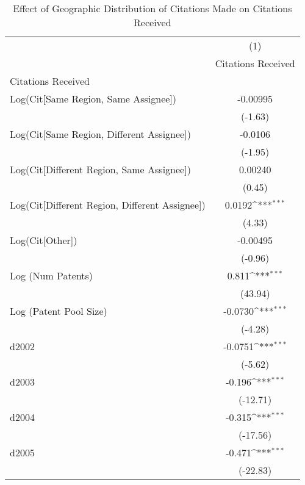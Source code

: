 {
\def\sym#1{\ifmmode^{#1}\else\(^{#1}\)\fi}
\begin{longtable}{l*{1}{c}}
\caption{Effect of Geographic Distribution of Citations Made on Citations Received \label{xtnbreg01}}\\
\hline\hline\endfirsthead\hline\endhead\hline\endfoot\endlastfoot
                    &\multicolumn{1}{c}{(1)}\\
                    &\multicolumn{1}{c}{Citations Received}\\
\hline
Citations Received  &                     \\
Log(Cit[Same Region, Same Assignee])&    -0.00995         \\
                    &     (-1.63)         \\
[1em]
Log(Cit[Same Region, Different Assignee])&     -0.0106         \\
                    &     (-1.95)         \\
[1em]
Log(Cit[Different Region, Same Assignee])&     0.00240         \\
                    &      (0.45)         \\
[1em]
Log(Cit[Different Region, Different Assignee])&      0.0192\sym{***}\\
                    &      (4.33)         \\
[1em]
Log(Cit[Other])     &    -0.00495         \\
                    &     (-0.96)         \\
[1em]
Log (Num Patents)   &       0.811\sym{***}\\
                    &     (43.94)         \\
[1em]
Log (Patent Pool Size)&     -0.0730\sym{***}\\
                    &     (-4.28)         \\
[1em]
d2002               &     -0.0751\sym{***}\\
                    &     (-5.62)         \\
[1em]
d2003               &      -0.196\sym{***}\\
                    &    (-12.71)         \\
[1em]
d2004               &      -0.315\sym{***}\\
                    &    (-17.56)         \\
[1em]
d2005               &      -0.471\sym{***}\\
                    &    (-22.83)         \\

\end{longtable}}
